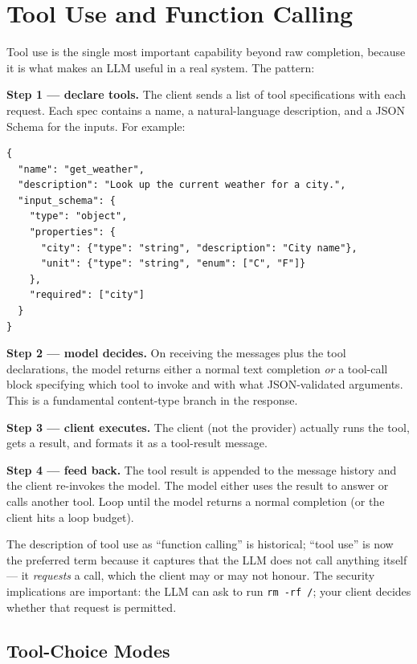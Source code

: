 \section{Tool Use and Function Calling}

Tool use is the single most important capability beyond raw
completion, because it is what makes an LLM useful in a real
system. The pattern:

\textbf{Step 1 --- declare tools.} The client sends a list of
tool specifications with each request. Each spec contains a
name, a natural-language description, and a JSON Schema for the
inputs. For example:

\begin{lstlisting}
{
  "name": "get_weather",
  "description": "Look up the current weather for a city.",
  "input_schema": {
    "type": "object",
    "properties": {
      "city": {"type": "string", "description": "City name"},
      "unit": {"type": "string", "enum": ["C", "F"]}
    },
    "required": ["city"]
  }
}
\end{lstlisting}

\textbf{Step 2 --- model decides.} On receiving the messages plus
the tool declarations, the model returns either a normal text
completion \emph{or} a tool-call block specifying which tool to
invoke and with what JSON-validated arguments. This is a
fundamental content-type branch in the response.

\textbf{Step 3 --- client executes.} The client (not the
provider) actually runs the tool, gets a result, and formats it
as a tool-result message.

\textbf{Step 4 --- feed back.} The tool result is appended to the
message history and the client re-invokes the model. The model
either uses the result to answer or calls another tool. Loop
until the model returns a normal completion (or the client hits a
loop budget).

The description of tool use as ``function calling'' is historical;
``tool use'' is now the preferred term because it captures that
the LLM does not call anything itself --- it \emph{requests} a
call, which the client may or may not honour. The security
implications are important: the LLM can ask to run
\texttt{rm -rf /}; your client decides whether that request is
permitted.

\subsection{Tool-Choice Modes}

